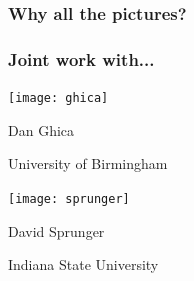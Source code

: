 \begin{frame}
    \frametitle{Why all the pictures?}
    \centering

    \Huge


\end{frame}
\begin{frame}
    \frametitle{Joint work with...}
    \centering
    \begin{minipage}{0.4\textwidth}
        \centering

        \texttt{[image: ghica]}

        \vspace{0.5em}

        \alert{Dan Ghica}

        University of Birmingham
    \end{minipage}
    \qquad
    \begin{minipage}{0.4\textwidth}
        \centering
        \texttt{[image: sprunger]}

        \vspace{0.5em}

        \alert{David Sprunger}

        Indiana State University
    \end{minipage}
\end{frame}